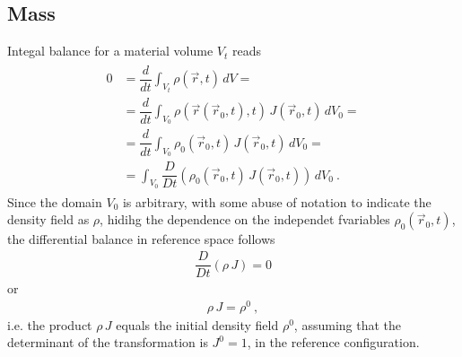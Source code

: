 \documentclass[letterpaper,10pt,english]{jupyterBook}
\begin{document}
\subsection{Mass}
\label{\detokenize{ch/continuum/balance-reference-integral:mass}}\label{\detokenize{ch/continuum/balance-reference-integral:continuum-governing-equations-reference-integral-mass}}
\sphinxAtStartPar
Integal balance for a material volume \(V_t\) reads
\begin{equation*}
\begin{split}\begin{aligned}
  0 
  & = \dfrac{d}{dt}\int_{V_t} \rho(\vec{r}, t) \, dV = \\
  & = \dfrac{d}{dt}\int_{V_0} \rho(\vec{r}(\vec{r}_0,t), t) \, J(\vec{r}_0,t) \, dV_0 = \\
  & = \dfrac{d}{dt}\int_{V_0} \rho_0(\vec{r}_0,t) \, J(\vec{r}_0,t) \, dV_0 = \\
  & = \int_{V_0} \dfrac{D}{D t} \left( \rho_0(\vec{r}_0,t) \, J(\vec{r}_0,t) \right) \, dV_0 \ . 
\end{aligned}\end{split}
\end{equation*}
\sphinxAtStartPar
Since the domain \(V_0\) is arbitrary, with some abuse of notation to indicate the density field as \(\rho\), hidihg the dependence on the independet fvariables \(\rho_0(\vec{r}_0,t)\), the differential balance in reference space follows
\begin{equation*}
\begin{split}\dfrac{D}{Dt} \left( \rho \, J \right) = 0\end{split}
\end{equation*}
\sphinxAtStartPar
or
\begin{equation*}
\begin{split}\rho \, J = \rho^0 \ ,\end{split}
\end{equation*}
\sphinxAtStartPar
i.e. the product \(\rho \, J\) equals the initial density field \(\rho^0\), assuming that the determinant of the transformation is \(J^0 = 1\), in the reference configuration.
\end{document}
